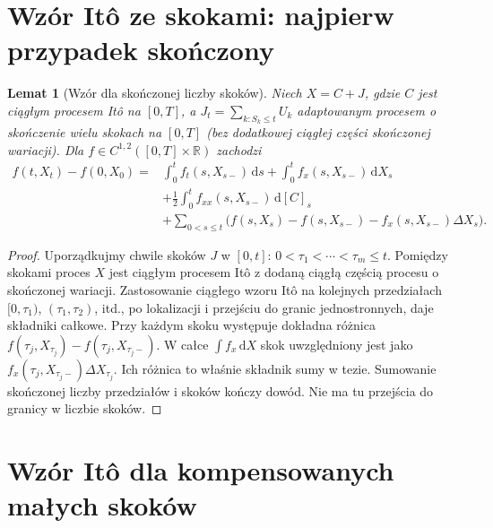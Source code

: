 \documentclass[11pt,a4paper,oneside]{report}
\numberwithin{equation}{chapter}
\theoremstyle{plain}
\newtheorem{lemat}[twierdzenie]{Lemat}
\theoremstyle{definition}
\theoremstyle{remark}
\newcommand{\R}{\mathbb{R}}
\newcommand{\dd}{\mathrm{d}}
\begin{document}
\section{Wzór Itô ze skokami: najpierw przypadek skończony}

\begin{lemat}[Wzór dla skończonej liczby skoków]
\label{lem:finite-jump-ito}
Niech $X=C+J$, gdzie $C$ jest ciągłym procesem Itô
na $[0,T]$, a $J_t=\sum_{k:S_k\le t}U_k$ adaptowanym procesem
o skończenie wielu skokach na $[0,T]$ (bez dodatkowej
ciągłej części skończonej wariacji).
Dla $f\in C^{1,2}([0,T]\times\R)$ zachodzi
\[
\begin{split}
f(t,X_t)-f(0,X_0)={}&\int_0^t f_t(s,X_{s-})\,\dd s
+\int_0^t f_x(s,X_{s-})\,\dd X_s\\
&+\frac12\int_0^t f_{xx}(s,X_{s-})\,\dd[C]_s\\
&+\sum_{0<s\le t}\bigl(f(s,X_s)-f(s,X_{s-})
-f_x(s,X_{s-})\Delta X_s\bigr).
\end{split}
\tag{12.3}\label{eq:ito-finite-jumps}
\]
\end{lemat}
\begin{proof}
Uporządkujmy chwile skoków $J$ w $[0,t]$:
$0<\tau_1<\cdots<\tau_m\le t$. Pomiędzy skokami
proces $X$ jest ciągłym procesem Itô z dodaną
ciągłą częścią procesu o skończonej wariacji.
Zastosowanie ciągłego wzoru Itô na kolejnych przedziałach
$[0,\tau_1)$, $(\tau_1,\tau_2)$, itd., po lokalizacji i
przejściu do granic jednostronnych, daje składniki
całkowe. Przy każdym skoku występuje dokładna różnica
$f(\tau_j,X_{\tau_j})-f(\tau_j,X_{\tau_j-})$.
W całce $\int f_x\,\dd X$ skok uwzględniony jest jako
$f_x(\tau_j,X_{\tau_j-})\Delta X_{\tau_j}$.
Ich różnica to właśnie składnik sumy w tezie.
Sumowanie skończonej liczby przedziałów i skoków
kończy dowód. Nie ma tu przejścia do granicy w liczbie skoków.
\end{proof}

\section{Wzór Itô dla kompensowanych małych skoków}
\end{document}
